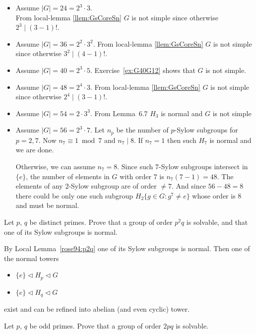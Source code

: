 \documentclass[12pt]{book}
\newcommand{\eG}{\ensuremath{\{e\}}}
\def\subnormal{\vartriangleleft}
\newcounter{myenumi}
\newenvironment{myenumerate}
{\begin{enumerate}
 \setcounter{enumi}{\themyenumi}
}
{\setcounter{myenumi}{\theenumi}
 \end{enumerate}}
\begin{document}
\begin{myenumerate}
\begin{itemize}
 \item Assume \(|G|=24=2^3\cdot3\).\\
    From local-lemma \ref{llem:GsCoreSn} $G$ is not simple since otherwise
    \(2^3\mid(3-1)!\).
 \item Assume \(|G|=36=2^2\cdot3^2\).
    From local-lemma \ref{llem:GsCoreSn} $G$ is not simple since otherwise
    \(3^2\mid(4-1)!\).
 \item Assume \(|G|=40=2^3\cdot5\).
    Exercise~\ref{ex:G40G12} shows that $G$ is not simple.
 \item Assume \(|G|=48=2^4\cdot3\).
    From local-lemma \ref{llem:GsCoreSn} $G$ is not simple since otherwise
    \(2^4\mid (3-1)!\).
 \item Assume \(|G|=54=2\cdot3^3\).
    From Lemma~6.7 \(H_3\) is normal and $G$ is not simple
 \item Assume \(|G|=56=2^3\cdot7\).
    Let \(n_p\) be the number of $p$-Sylow subgroups for \(p=2,7\).
    Now \(n_7\equiv 1 \bmod 7\) and \(n_7\mid 8\).
    If \(n_7=1\) then such \(H_7\) is normal and we are done.

    Otherwise, we can assume \(n_7=8\). %
    Since such $7$-Sylow subgroups intersect in \eG,
    the number of elements
    in $G$ with order $7$ is \(n_7(7-1)=48\).
    The elements of any $2$-Sylow subgroup are of order \(\neq7\).
    And since \(56-48=8\) there could be only
    one such subgroup \(H_2\{g\in G: g^7\neq e\}\) whose order is $8$
    and must be normal.
\end{itemize}

\begin{excopy}
Let $p$, $q$ be distinct primes. Prove that a group of order \(p^2q\)
is solvable, and that one of its Sylow subgroups is normal.
\end{excopy}  \label{ex:p2q}

By Local Lemma~\ref{rose94:p2q} one of its Sylow subgroups is normal.
Then one of the normal towers
\begin{itemize}
 \item[] \(\eG \subnormal H_p \subnormal G\)
 \item[] \(\eG \subnormal H_q \subnormal G\)
\end{itemize}
exist and can be refined into abelian (and even cyclic) tower.

\begin{excopy}
Let $p$, $q$ be odd primes. Prove that a group of order \(2pq\) is solvable.
\end{excopy}  \label{ex:2pq}


\end{myenumerate}
\end{document}
